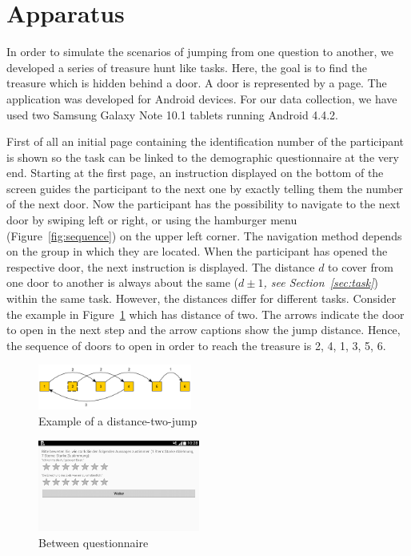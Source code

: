 \documentclass{sig-alternate-05-2015}
\begin{document}
\section{Apparatus}
In order to simulate the scenarios of jumping from one question to another, we developed a series of treasure hunt like tasks. Here, the goal is to find the treasure which is hidden behind a door. A door is represented by a page. The application was developed for Android devices. For our data collection, we have used two Samsung Galaxy Note 10.1 tablets running Android 4.4.2.

First of all an initial page containing the identification number of the participant is shown so the task can be linked to the demographic questionnaire at the very end. Starting at the first page, an instruction displayed on the bottom of the screen guides the participant to the next one by exactly telling them the number of the next door. Now the participant has the possibility to navigate to the next door by swiping left or right, or using the hamburger menu (Figure~\ref{fig:sequence}) on the upper left corner. The navigation method depends on the group in which they are located. When the participant has opened the respective door, the next instruction is displayed. The distance $d$ to cover from one door to another is always about the same ($d \pm 1$\textit{, see Section~\ref{sec:task}}) within the same task. However, the distances differ for different tasks. Consider the example in Figure~\ref{fig:jump} which has distance of two. The arrows indicate the door to open in the next step and the arrow captions show the jump distance. Hence, the sequence of doors to open in order to reach the treasure is 2, 4, 1, 3, 5, 6.
\begin{figure}
	\centering
	\includegraphics[width=0.45\textwidth]{pics/jump}
	\caption{Example of a distance-two-jump}\label{fig:jump}
\end{figure}
\begin{figure}
	\centering
	\includegraphics[width=0.475\textwidth]{pics/screenshots/global3-cut}
	\caption{Between questionnaire}\label{fig:between_questionnaire}
\end{figure}
\end{document}
